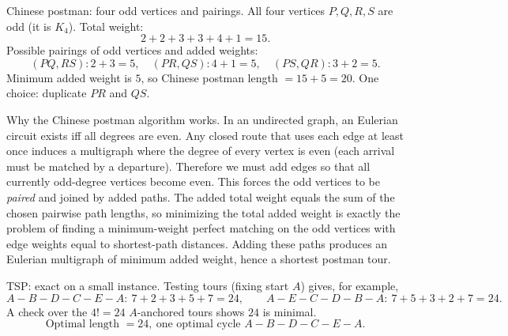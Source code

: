 \documentclass[11pt]{article}
\def\textbf#1{#1}%
\begin{document}
\begin{solution}
\textbf{Chinese postman: four odd vertices and pairings.}
All four vertices $P,Q,R,S$ are odd (it is $K_4$). Total weight:
\[
2+2+3+3+4+1=15.
\]
Possible pairings of odd vertices and added weights:
\[
(PQ,RS): 2+3=5,\quad (PR,QS): 4+1=5,\quad (PS,QR): 3+2=5.
\]
Minimum added weight is $5$, so Chinese postman length $=15+5=20$.
One choice: duplicate $PR$ and $QS$.

\begin{center}
\end{center}
\end{solution}

\begin{solution}
\textbf{Why the Chinese postman algorithm works.}
In an undirected graph, an Eulerian circuit exists iff all degrees are even. Any closed route that uses each edge at least once induces a multigraph where the degree of every vertex is even (each arrival must be matched by a departure). Therefore we must add edges so that all currently odd-degree vertices become even. This forces the odd vertices to be \emph{paired} and joined by added paths. The added total weight equals the sum of the chosen pairwise path lengths, so minimizing the total added weight is exactly the problem of finding a minimum-weight perfect matching on the odd vertices with edge weights equal to shortest-path distances. Adding these paths produces an Eulerian multigraph of minimum added weight, hence a shortest postman tour.
\end{solution}

\begin{solution}
\textbf{TSP: exact on a small instance.}
Testing tours (fixing start $A$) gives, for example,
\[
A\!-\!B\!-\!D\!-\!C\!-\!E\!-\!A:\ 7+2+3+5+7=24,\qquad
A\!-\!E\!-\!C\!-\!D\!-\!B\!-\!A:\ 7+5+3+2+7=24.
\]
A check over the $4!=24$ $A$-anchored tours shows $24$ is minimal.  
\[
\boxed{\text{Optimal length }=24,\ \text{one optimal cycle }A\!-\!B\!-\!D\!-\!C\!-\!E\!-\!A.}
\]
\end{solution}
\end{document}
